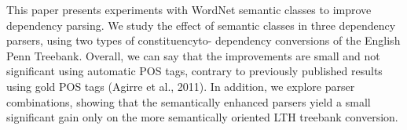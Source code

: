 This paper presents experiments with WordNet semantic classes to improve dependency parsing. We study the effect of semantic classes in three dependency parsers, using two types of constituencyto- dependency conversions of the English Penn Treebank. Overall, we can say that the improvements are small and not significant using automatic POS tags, contrary to previously published results using gold POS tags (Agirre et al., 2011). In addition, we explore parser combinations, showing that the semantically enhanced parsers yield a small significant gain only on the more semantically oriented LTH treebank conversion.
